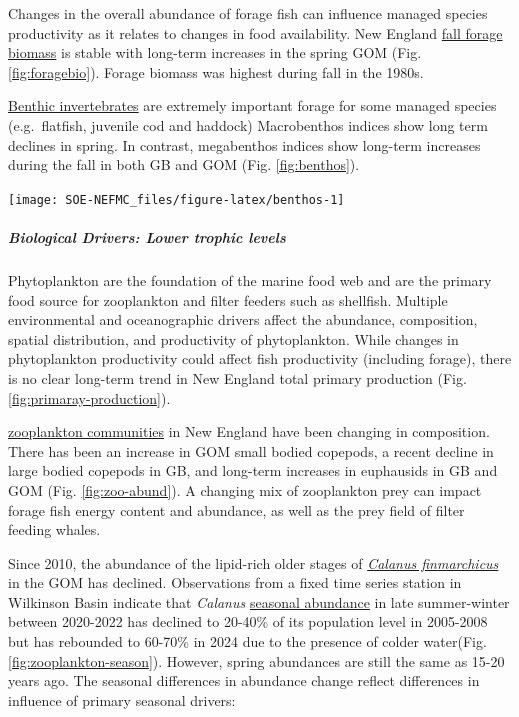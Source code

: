\documentclass[
  10pt,
]{article}
\begin{document}
Changes in the overall abundance of forage fish can influence managed species productivity as it relates to changes in food availability. New England \href{https://noaa-edab.github.io/catalog/forage_index.html}{fall forage biomass} is stable with long-term increases in the spring GOM (Fig. \ref{fig:foragebio}). Forage biomass was highest during fall in the 1980s.

\href{https://noaa-edab.github.io/catalog/benthos_index.html}{Benthic invertebrates} are extremely important forage for some managed species (e.g.~flatfish, juvenile cod and haddock) Macrobenthos indices show long term declines in spring. In contrast, megabenthos indices show long-term increases during the fall in both GB and GOM (Fig. \ref{fig:benthos}).

\begin{center}\texttt{[image: SOE-NEFMC\_files/figure-latex/benthos-1]} \end{center}

\hypertarget{biological-drivers-lower-trophic-levels}{%
\subparagraph{Biological Drivers: Lower trophic levels}\label{biological-drivers-lower-trophic-levels}}

Phytoplankton are the foundation of the marine food web and are the primary food source for zooplankton and filter feeders such as shellfish. Multiple environmental and oceanographic drivers affect the abundance, composition, spatial distribution, and productivity of phytoplankton. While changes in phytoplankton productivity could affect fish productivity (including forage), there is no clear long-term trend in New England total primary production (Fig. \ref{fig:primaray-production}).

\href{https://noaa-edab.github.io/catalog/zoo_abundance_anom.html}{zooplankton communities} in New England have been changing in composition. There has been an increase in GOM small bodied copepods, a recent decline in large bodied copepods in GB, and long-term increases in euphausids in GB and GOM (Fig. \ref{fig:zoo-abund}). A changing mix of zooplankton prey can impact forage fish energy content and abundance, as well as the prey field of filter feeding whales.

Since 2010, the abundance of the lipid-rich older stages of \href{https://noaa-edab.github.io/catalog/wbts_mesozooplankton.html}{\emph{Calanus finmarchicus}} in the GOM has declined. Observations from a fixed time series station in Wilkinson Basin indicate that \emph{Calanus} \href{https://noaa-edab.github.io/catalog/calanus_variation.html}{seasonal abundance} in late summer-winter between 2020-2022 has declined to 20-40\% of its population level in 2005-2008 but has rebounded to 60-70\% in 2024 due to the presence of colder water(Fig. \ref{fig:zooplankton-season}). However, spring abundances are still the same as 15-20 years ago. The seasonal differences in abundance change reflect differences in influence of primary seasonal drivers:
\end{document}

